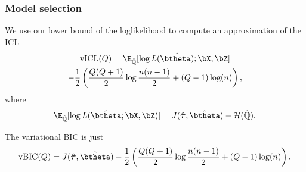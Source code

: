 \documentclass{beamer}\usepackage[]{graphicx}\usepackage[]{color}
\begin{document}
\begin{frame}
  \frametitle{Model selection}

  We use our lower bound of the  loglikelihood to compute an approximation of the ICL
  \begin{multline*}
  \mathrm{vICL}(Q) = \E_{\hat{\mathbb{Q}}} [\log L(\hat{\btheta)};\bX,\bZ] \\ - \frac{1}{2} \left(\frac{Q(Q+1)}{2} \log \frac{n(n-1)}{2} + (Q-1) \log (n) \right),
\end{multline*}
where
    \begin{equation*}
      \E_{\hat{\mathbb{Q}}} [\log L(\hat\btheta; \bX,\bZ)] = J(\hat{\boldsymbol\tau},\hat\btheta) - \mathcal{H}(\hat{\mathbb{Q}}).
    \end{equation*}

    The variational BIC is just
    \begin{equation*}
  \mathrm{vBIC}(Q) = J(\hat{\boldsymbol\tau},\hat\btheta) - \frac{1}{2} \left(\frac{Q(Q+1)}{2} \log \frac{n(n-1)}{2} + (Q-1) \log (n) \right).
    \end{equation*}

\end{frame}

% 
% 
% 
% 
% 
% 
% 
% 
% 
% 
% 
% 
% 
% 
% 
% 
\end{document}
